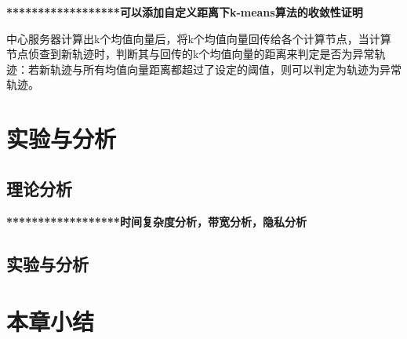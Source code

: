 \textbf{******************可以添加自定义距离下k-means算法的收敛性证明}


中心服务器计算出k个均值向量后，将k个均值向量回传给各个计算节点，当计算节点侦查到新轨迹时，判断其与回传的k个均值向量的距离来判定是否为异常轨迹：若新轨迹与所有均值向量距离都超过了设定的阈值，则可以判定为轨迹为异常轨迹。






\section{实验与分析}
\subsection{理论分析}
\textbf{******************时间复杂度分析，带宽分析，隐私分析}

\subsection{实验与分析}


\section{本章小结}